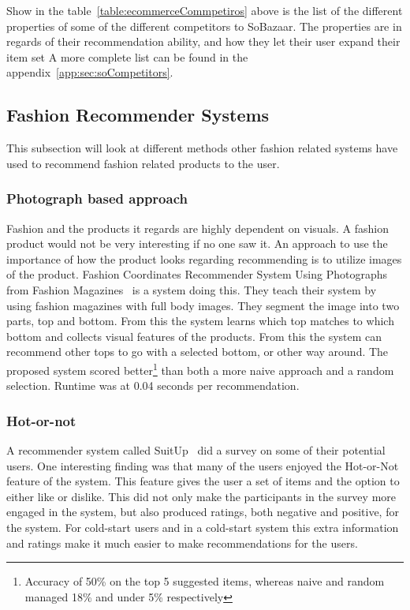 Show in the table~\ref{table:ecommerceCommpetiros} above is the list of the
different properties of some of the different competitors to SoBazaar. The
properties are in regards of their recommendation ability, and how they let
their user expand their item set A more complete list can be found in the
appendix~\ref{app:sec:soCompetitors}.

\subsection{Fashion Recommender Systems}

This subsection will look at different methods other fashion related
systems have used to recommend fashion related products to the user.

\subsubsection{Photograph based approach}
    Fashion and the products it regards are highly dependent on visuals.  A fashion
    product would not be very interesting if no one saw it.  An approach to use the
    importance of how the product looks regarding recommending is to utilize images
    of the product.  Fashion Coordinates Recommender System Using Photographs from
    Fashion Magazines~\cite{Iwata:2011} is a system doing this.  They teach their
    system by using fashion magazines with full body images.  They segment the
    image into two parts, top and bottom.  From this the system learns which top
    matches to which bottom and collects visual features of the products.  From
    this the system can recommend other tops to go with a selected bottom, or other
    way around.  The proposed system scored better\footnote{Accuracy of 50\% on the
    top 5 suggested items, whereas naive and random managed 18\% and under 5\%
    respectively} than both a more naive approach and a random selection.  Runtime
    was at 0.04 seconds per recommendation.

\subsubsection{Hot-or-not}
    A recommender system called SuitUp~\cite{SuitUp} did a survey on some of their potential users.
    One interesting finding was that many of the users enjoyed the Hot-or-Not feature of the system.
    This feature gives the user a set of items and the option to either like or dislike.
    This did not only make the participants in the survey more engaged in the system, but also produced ratings, both negative and positive, for the system.
    For cold-start users and in a cold-start system this extra information and ratings make it much easier to make recommendations for the users.

